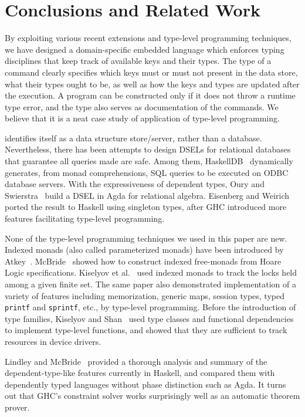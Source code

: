 
\section{Conclusions and Related Work}
\label{sec:conclusions}

By exploiting various recent extensions and type-level programming techniques,
we have designed a domain-specific embedded language \Edis{} which enforces
typing disciplines that keep track of available keys and their types. The
type of a command clearly specifies which keys must or must not present in
the data store, what their types ought to be, as well as how the keys and types are updated after the execution. A program can be constructed only if it does
not throw a runtime type error, and the type also serves as documentation of the
commands. We believe that it is a neat case study of application of type-level programming.

\Redis{} identifies itself as a data structure store/server, rather than a
database. Nevertheless, there has been attempts to design DSELs for relational
databases that guarantee all queries made are safe. Among them, {\sc HaskellDB}~\cite{haskelldb,haskelldbimproved} dynamically generates, from monad comprehensions, SQL queries to be executed on ODBC database servers.
With the expressiveness of dependent types, Oury and Swierstra~\cite{pi}
build a DSEL in Agda for relational algebra. Eisenberg and
Weirich~\cite{singletons} ported the result to Haskell using singleton types, after GHC introduced more features facilitating type-level programming.

None of the type-level programming techniques we used in this paper are new.
Indexed monads (also called parameterized monads) have been introduced by
Atkey~\cite{indexedmonad}. McBride~\cite{kleisli} showed how to construct
indexed free-monads from Hoare Logic specifications. Kiselyov et
al.~\cite{typefun} used indexed monads to track the locks held among a given
finite set. The same paper also demonstrated implementation of a variety of
features including memorization, generic maps, session types, typed
\texttt{printf} and \texttt{sprintf}, etc., by type-level programming.
Before the introduction of type families, Kiselyov and
Shan~\cite{staticresources} used type classes and functional dependencies to
implement type-level functions, and showed that they are sufficient to track
resources in device drivers.

Lindley and McBride~\cite{phasedistinction} provided a thorough analysis and summary of the dependent-type-like features currently in Haskell, and
compared them with dependently typed languages without phase distinction such as Agda. It turns out that GHC's constraint solver works surprisingly well as an
automatic theorem prover.
